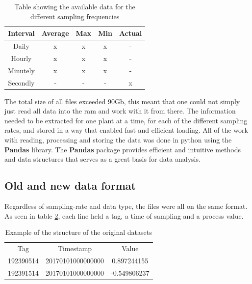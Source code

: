     \begin{table}[]
        \centering
        \begin{tabular}{|c|c|c|c|c|}
            \hline
             Interval   & Average   & Max   & Min   & Actual    \\ \hline
             Daily      & x         & x     & x     & -         \\ \hline
             Hourly     & x         & x     & x     & -         \\ \hline
             Minutely   & x         & x     & x     & -         \\ \hline
             Secondly   & -         & -     & -     & x         \\ \hline
        \end{tabular}
        \label{tab:data_files}
        \caption{Table showing the available data for the different sampling frequencies}
    \end{table}
    
    The total size of all files exceeded $90$Gb, this meant that one could not simply just read all data into the ram and work with it from there. The information needed to be extracted for one plant at a time, for each of the different sampling rates, and stored in a way that enabled fast and efficient loading. All of the work with reading, processing and storing the data was done in python using the \textbf{Pandas} library. The \textbf{Pandas} package \cite{Mckinney2010} provides efficient and intuitive methods and data structures that serves as a great basis for data analysis. 
    
    
    
    \subsection{Old and new data format}\label{subsec:data_format}
        Regardless of sampling-rate and data type, the files were all on the same format. As seen in table \ref{tab:orig_data}, each line held a tag, a time of sampling and a process value. 
        
        \begin{table}[h]
            \centering
            \begin{tabular}{|c c c|}
                \hline
                 Tag        & Timestamp         & Value  \\
                 192390514  & 20170101000000000 & 0.897244155 \\
                 192391514  & 20170101000000000 & -0.549806237 \\
                 \hline
            \end{tabular}
            \caption{Example of the structure of the original datasets}
            \label{tab:orig_data}
        \end{table}
        
